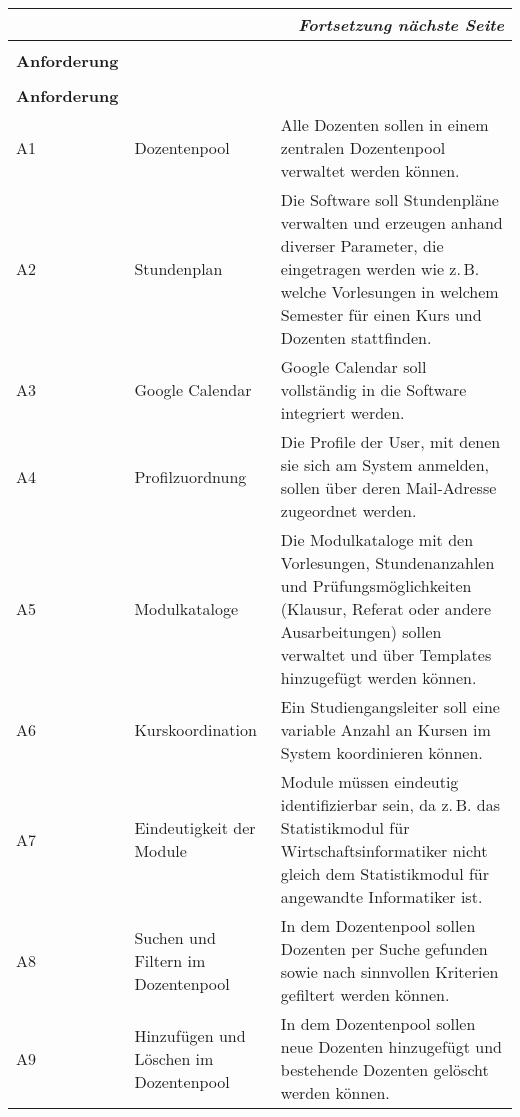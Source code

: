 \begin{longtable}[h]{|p{}|p{4cm}|p{}|}		
	\multicolumn{3}{|r|}{\textit{Fortsetzung nächste Seite}} \\ \hline
	\endfoot
	\endlastfoot
	\hline &&\\[-0.5em]
	\textbf{Anforderung} & \head{Kurztitel} & \head{Beschreibung} \\ \hline
	\endfirsthead
	\hline &&\\[-0.5em]
	\textbf{Anforderung} & \head{Kurztitel} & \head{Beschreibung} \\ \hline
	\endhead
	\parbox[t]{3cm}{A1} & Dozentenpool & Alle Dozenten sollen in einem zentralen Dozentenpool verwaltet werden können.\label{anf:Dozenten}\\ \hline
	\parbox[t]{3cm}{A2} & Stundenplan & Die Software soll Stundenpläne verwalten und erzeugen anhand diverser Parameter, die eingetragen werden wie z.\,B. welche Vorlesungen in welchem Semester für einen Kurs und Dozenten stattfinden.\\ \hline
	\parbox[t]{3cm}{A3} & Google Calendar & Google Calendar soll vollständig in die Software integriert werden.\label{anf:GC}\\ \hline
	\parbox[t]{3cm}{A4} & Profilzuordnung & Die Profile der User, mit denen sie sich am System anmelden, sollen über deren  Mail-Adresse zugeordnet werden.\label{anf:Profilzuordnung}\\ \hline
	\parbox[t]{3cm}{A5} & Modulkataloge & Die Modulkataloge mit den Vorlesungen, Stundenanzahlen und Prüfungsmöglichkeiten (Klausur, Referat oder andere Ausarbeitungen) sollen verwaltet und über Templates hinzugefügt werden können.\label{anf:Modulkatalog} \\ \hline
	\parbox[t]{3cm}{A6} & Kurskoordination & Ein Studiengangsleiter soll eine variable Anzahl an Kursen im System koordinieren können.\\ \hline
	\parbox[t]{3cm}{A7} & Eindeutigkeit der Module & Module müssen eindeutig identifizierbar sein, da z.\,B. das Statistikmodul für Wirtschaftsinformatiker nicht gleich dem Statistikmodul für angewandte Informatiker ist.\\ \hline
	\parbox[t]{3cm}{A8} & Suchen und Filtern im Dozentenpool & In dem Dozentenpool sollen Dozenten per Suche gefunden sowie nach sinnvollen Kriterien gefiltert werden können.\\ \hline
	\parbox[t]{3cm}{A9} & Hinzufügen und Löschen im Dozentenpool & In dem Dozentenpool sollen neue Dozenten hinzugefügt und bestehende Dozenten gelöscht werden können.\\ \hline

\end{longtable}
